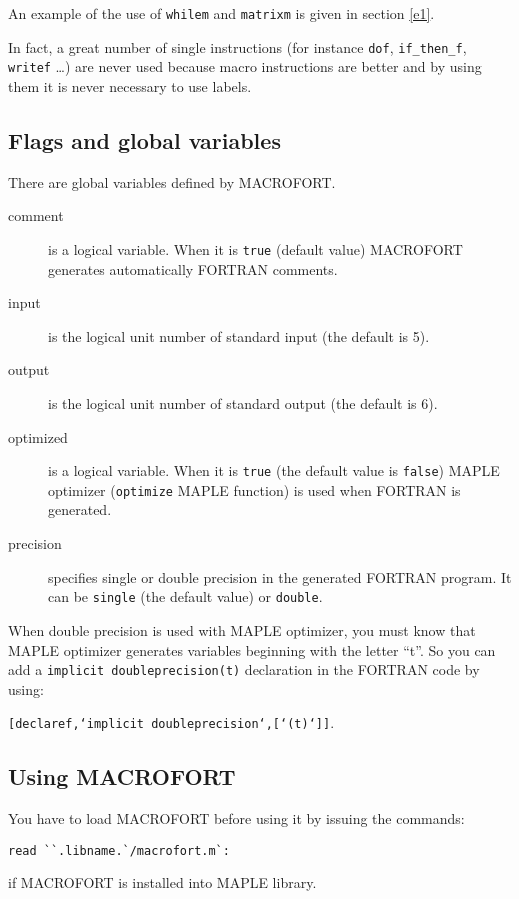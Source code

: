 An example of the use of {\tt whilem} and {\tt matrixm} is given
in section \ref{e1}.

In fact, a great number of 
single instructions (for instance {\tt dof}, {\tt if\_then\_f}, 
{\tt writef} \ldots)
are never used because macro instructions are
better and by using them it is never necessary to use labels.

\subsection{Flags and global variables}

There are global variables defined by MACROFORT.

\begin{description}
  \item[comment] is a logical variable. When it is  {\tt true} 
(default value) MACROFORT generates automatically FORTRAN comments.
  \item[input] is the logical unit number of standard input (the default
is 5).
  \item[output] is the logical unit number of standard output (the default
is 6).
  \item[optimized] is a logical variable. When it is {\tt true} (the default
value is {\tt false}) MAPLE optimizer ({\tt optimize} MAPLE function)
is used when FORTRAN is generated.
  \item[precision] specifies single or double precision in the generated
FORTRAN program. It can be {\tt single} (the default value) or {\tt double}.
\end{description}

When double precision is used with MAPLE optimizer, you must know that
MAPLE optimizer generates variables beginning with the letter
``t''. So you can add a {\tt implicit doubleprecision(t)} declaration 
in the FORTRAN code by using:
 
{\tt [declaref,`implicit doubleprecision`,[`(t)`]]}.

\subsection{Using MACROFORT}

You have to load MACROFORT before using it by issuing the commands:
\begin{verbatim}
read ``.libname.`/macrofort.m`:
\end{verbatim}
if MACROFORT is installed into MAPLE library.


